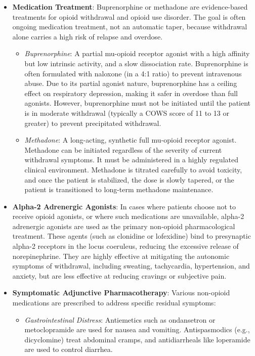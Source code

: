 \begin{itemize}
    \item \textbf{Medication Treatment}: Buprenorphine or methadone are evidence-based treatments for opioid withdrawal and opioid use disorder. The goal is often ongoing medication treatment, not an automatic taper, because withdrawal alone carries a high risk of relapse and overdose.
    \begin{itemize}
        \item \textit{Buprenorphine}: A partial mu-opioid receptor agonist with a high affinity but low intrinsic activity, and a slow dissociation rate. Buprenorphine is often formulated with naloxone (in a 4:1 ratio) to prevent intravenous abuse. Due to its partial agonist nature, buprenorphine has a ceiling effect on respiratory depression, making it safer in overdose than full agonists. However, buprenorphine must not be initiated until the patient is in moderate withdrawal (typically a COWS score of 11 to 13 or greater) to prevent precipitated withdrawal.
        \item \textit{Methadone}: A long-acting, synthetic full mu-opioid receptor agonist. Methadone can be initiated regardless of the severity of current withdrawal symptoms. It must be administered in a highly regulated clinical environment. Methadone is titrated carefully to avoid toxicity, and once the patient is stabilized, the dose is slowly tapered, or the patient is transitioned to long-term methadone maintenance.
    \end{itemize}
    \item \textbf{Alpha-2 Adrenergic Agonists}: In cases where patients choose not to receive opioid agonists, or where such medications are unavailable, alpha-2 adrenergic agonists are used as the primary non-opioid pharmacological treatment. These agents (such as clonidine or lofexidine) bind to presynaptic alpha-2 receptors in the locus coeruleus, reducing the excessive release of norepinephrine. They are highly effective at mitigating the autonomic symptoms of withdrawal, including sweating, tachycardia, hypertension, and anxiety, but are less effective at reducing cravings or subjective pain.
    \item \textbf{Symptomatic Adjunctive Pharmacotherapy}: Various non-opioid medications are prescribed to address specific residual symptoms:
    \begin{itemize}
        \item \textit{Gastrointestinal Distress}: Antiemetics such as ondansetron or metoclopramide are used for nausea and vomiting. Antispasmodics (e.g., dicyclomine) treat abdominal cramps, and antidiarrheals like loperamide are used to control diarrhea.

\end{itemize}
\end{itemize}
